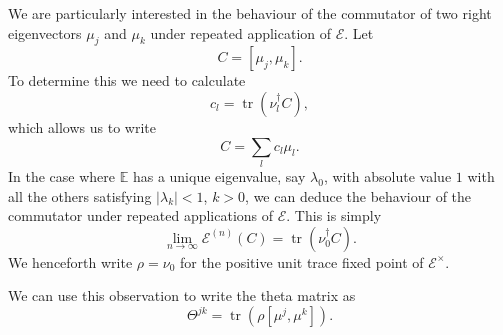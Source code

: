 \documentclass[prl,twocolumn,lengthcheck,superscriptaddress]{revtex4-1}
\newcommand{\tr}{\operatorname{tr}}
\theoremstyle{definition}
\theoremstyle{remark}
\begin{document}
We are particularly interested in the behaviour of the commutator of two right eigenvectors $\mu_j$ and $\mu_k$ under repeated application of $\mathcal{E}$. Let 
\begin{equation}
	C = [\mu_j, \mu_k].
\end{equation}
To determine this we need to calculate
\begin{equation}
	c_l = \tr(\nu^\dag_l C),
\end{equation}
which allows us to write
\begin{equation}
	C = \sum_{l} c_l \mu_l.
\end{equation}
In the case where $\mathbb{E}$ has a unique eigenvalue, say $\lambda_0$, with absolute value $1$ with all the others satisfying $|\lambda_k| < 1$, $k > 0$, we can deduce the behaviour of the commutator under repeated applications of $\mathcal{E}$. This is simply 
\begin{equation}
	\lim_{n\rightarrow \infty}\mathcal{E}^{(n)}(C) = \tr(\nu_0^\dag C).
\end{equation}
We henceforth write $\rho = \nu_0$ for the positive unit trace fixed point of $\mathcal{E}^\times$.

We can use this observation to write the theta matrix as
\begin{equation}
	\Theta^{jk} = \tr(\rho [\mu^j, \mu^k]).
\end{equation}
\end{document}

